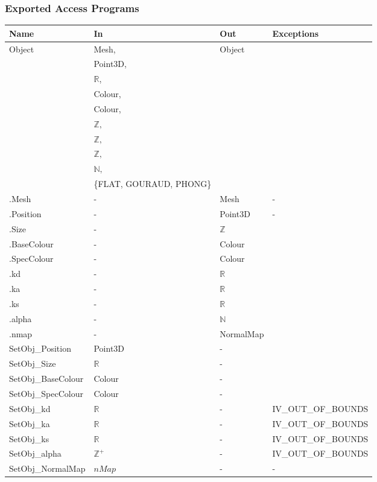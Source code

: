 \documentclass[12pt, titlepage]{article}
\begin{document}
\subsubsection{Exported Access Programs}
\begin{center}
	\begin{tabular}{p{4cm} p{2cm} p{2cm} p{4cm}}
		\hline
		\textbf{Name} & \textbf{In} & \textbf{Out} & \textbf{Exceptions} \\
		\hline
		
		\multirow{10}{*}{Object} & Mesh, & Object & \\
		& Point3D, & & \\
		& $\mathbb{R}$, & & \\  
		& Colour, & & \\
		& Colour, & & \\
		& $\mathbb{Z},$ & & \\
		& $\mathbb{Z},$ & & \\
		& $\mathbb{Z},$ & & \\
		& $\mathbb{N},$ & & \\
		& \{FLAT, GOURAUD, PHONG\} & & \\		
		.Mesh & - & Mesh & - \\
		.Position & - & Point3D & - \\
		.Size &- & $\mathbb{Z}$ & \\
		.BaseColour &- & Colour & \\
		.SpecColour &- & Colour & \\
		.kd &- & $\mathbb{R}$ & \\
		.ka &- & $\mathbb{R}$& \\
		.ks &- & $\mathbb{R}$ & \\
		.alpha &- & $\mathbb{N}$ & \\
		.nmap &- & NormalMap& \\ 
		SetObj\_Position & Point3D & - & \\
		SetObj\_Size & $\mathbb{R}$ & - & \\
		SetObj\_BaseColour & Colour &- & \\
		SetObj\_SpecColour & Colour &- & \\
		SetObj\_kd & $\mathbb{R}$ &- & IV\_OUT\_OF\_BOUNDS\\
		SetObj\_ka & $\mathbb{R}$&- & IV\_OUT\_OF\_BOUNDS\\
		SetObj\_ks & $\mathbb{R}$ &- & IV\_OUT\_OF\_BOUNDS\\
		SetObj\_alpha & $\mathbb{Z}^+$ &- & IV\_OUT\_OF\_BOUNDS\\
		SetObj\_NormalMap & $nMap$ &- &- \\
		\hline
	\end{tabular}
\end{center}
\end{document}
